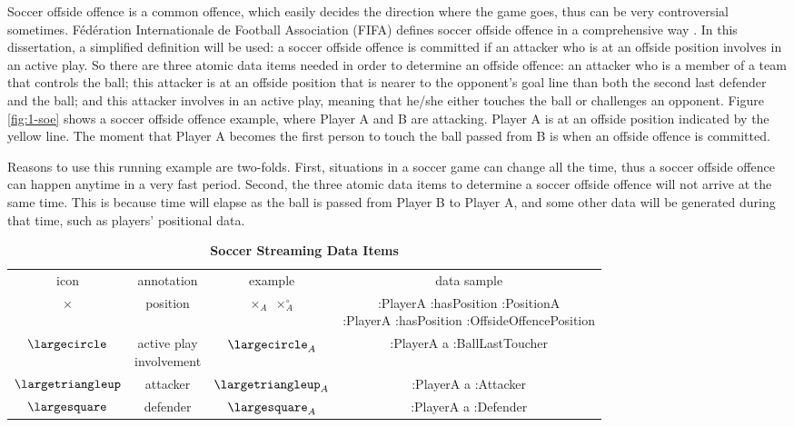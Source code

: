 Soccer offside offence is a common offence, which easily decides the direction where the game goes, thus can be very controversial sometimes.
F\'ed\'eration Internationale de Football Association (FIFA) defines soccer offside offence in a comprehensive way \cite{federation2016laws}. 
In this dissertation, a simplified definition will be used: 
a soccer offside offence is committed if an attacker who is at an offside position involves in an active play. 
So there are three atomic data items needed in order to determine an offside offence:
an attacker who is a member of a team that controls the ball;
this attacker is at an offside position that is nearer to the opponent's goal line than both the second last defender and the ball;
and this attacker involves in an active play, meaning that he/she either touches the ball or challenges an opponent. 
Figure \ref{fig:1-soe} shows a soccer offside offence example, where Player A and B are attacking.
Player A is at an offside position indicated by the yellow line. 
The moment that Player A becomes the first person to touch the ball passed from B is when an offside offence is committed.

Reasons to use this running example are two-folds.
First, situations in a soccer game can change all the time, thus a soccer offside offence can happen anytime in a very fast period. 
Second, the three atomic data items to determine a soccer offside offence will not arrive at the same time. 
This is because time will elapse as the ball is passed from Player B to Player A, and some other data will be generated during that time, such as players' positional data.

\begin{table}[!htbp]
	\centering
	\caption{\textbf{Soccer Streaming Data Items}}
	\label{tab:icons}
	\begin{tabular}{|c||c|c|c|} \hline
		icon & annotation & example & data sample \\ \hhline{|=#=|=|=|}
    	$\times$ & position & \makecell{$\times_{A}$ \\ $\times^{\circ}_{A}$} & \makecell{:PlayerA :hasPosition :PositionA \\ :PlayerA :hasPosition :OffsideOffencePosition} \\ \hline 
		$\largecircle$ & \makecell{active play \\involvement} & $\largecircle_{A}$ & :PlayerA a :BallLastToucher \\ \hline
		$\largetriangleup$ & attacker & $\largetriangleup_{A}$ & :PlayerA a :Attacker \\ \hline
		$\largesquare$ & defender & $\largesquare_{A}$ & :PlayerA a :Defender \\ \hline
	\end{tabular}
\end{table}

